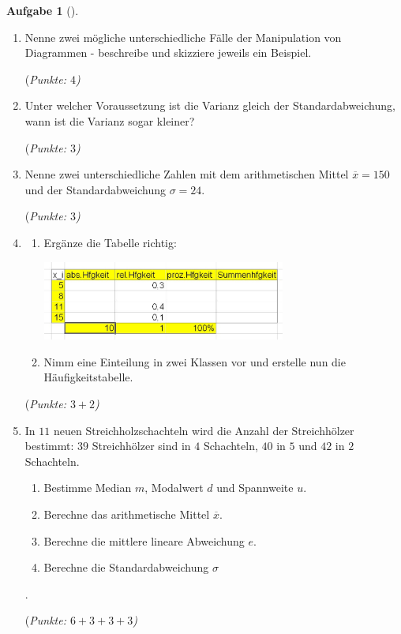 \documentclass[a4paper, twoside, parskip, 10pt, smallheadings]{scrbook}
\theoremstyle{plain}
\theoremstyle{definition}
\newtheorem{Auf}{Aufgabe}%
\newenvironment{fshaded}{%
\def\FrameCommand{\fcolorbox{framecolor}{shadecolor}}%
\MakeFramed {\FrameRestore}}%
{\endMakeFramed}
\newenvironment{fauf}[1][]{\definecolor{shadecolor}{rgb}{.58,.788,1}%
\definecolor{framecolor}{rgb}{.13,.25,.9}%
\begin{fshaded}\begin{Auf}[#1]}{\end{Auf}\end{fshaded}}
\newcommand{\ba}{\begin{fauf}}
\newcommand{\ea}{\end{fauf}}
\begin{document}
\ba
\begin{enumerate} \item Nenne zwei mögliche unterschiedliche Fälle der Manipulation von Diagrammen - beschreibe und skizziere jeweils ein Beispiel.


\hfill {(\it Punkte: $4$)}

\item Unter welcher Voraussetzung ist die Varianz gleich der Standardabweichung, wann ist die Varianz sogar kleiner?

\hfill {(\it Punkte: $3$)}

\item Nenne zwei unterschiedliche Zahlen mit dem arithmetischen Mittel $\overline{x}=150$ und der Standardabweichung $\sigma =24$.


\hfill {(\it Punkte: $3$)}
\item \begin{enumerate} \item Ergänze die Tabelle richtig:

\begin{center}\includegraphics[width=8cm]{2te/beschreibendestatistik/bilder/2a.jpg}\end{center}

\item Nimm eine Einteilung in zwei Klassen vor und erstelle nun die Häufigkeitstabelle.
\end{enumerate}
\hfill {(\it Punkte: $3+2$)}

\item  In $11$ neuen Streichholzschachteln wird die Anzahl der Streichhölzer bestimmt:
$39$ Streichhölzer sind in $4$ Schachteln, $40$ in $5$ und $42$ in $2$ Schachteln.
\begin{enumerate} \item Bestimme Median $m$, Modalwert $d$ und Spannweite $u$.
\item Berechne das arithmetische Mittel $\overline{x}$.
\item Berechne die mittlere lineare Abweichung $e$.
\item Berechne die Standardabweichung $\sigma$\end{enumerate}.


\hfill {(\it Punkte: $6+3+3+3$)}
\end{enumerate}
\ea
\end{document}

